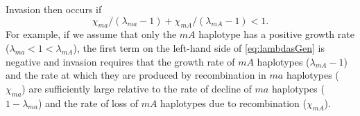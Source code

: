 \documentclass[12pt]{article}
\begin{document}
Invasion then occurs if
\begin{equation}\label{eq:lambdasGen}
\chi_{ma}/\left(\lambda_{ma}-1\right) + \chi_{mA}/\left(\lambda_{mA}-1\right) < 1.
\end{equation}
\noindent For example, if we assume that only the $mA$ haplotype has a positive growth rate ($\lambda_{ma}<1<\lambda_{mA}$), the first term on the left-hand side of \eqref{eq:lambdasGen} is negative and invasion requires that the growth rate of $mA$ haplotypes ($\lambda_{mA}-1$) and the rate at which they are produced by recombination in $ma$ haplotypes ($\chi_{ma}$) are sufficiently large relative to the rate of decline of $ma$ haplotypes ($1-\lambda_{ma}$) and the rate of loss of $mA$ haplotypes due to recombination ($\chi_{mA}$).
\end{document}
